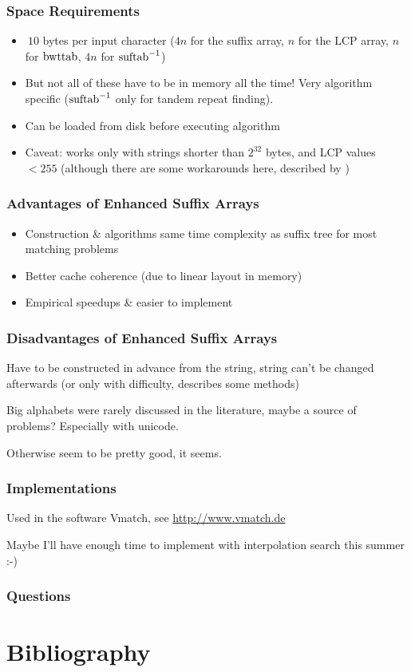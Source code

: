 \documentclass[compress,handout]{beamer} %
\begin{document}
\begin{frame}
	\frametitle{Space Requirements}
	\begin{itemize}
		\item $~10$ bytes per input character ($4n$ for the suffix array, $n$ for the LCP array, $n$ for $\hbox{bwttab}$, $4n$ for $\hbox{suftab}^{-1}$)
		\item But not all of these have to be in memory all the time! Very algorithm specific ($\hbox{suftab}^{-1}$ only for tandem repeat finding).
		\item Can be loaded from disk before executing algorithm
		\item Caveat: works only with strings shorter than $2^{32}$ bytes, and LCP values $<255$ (although there are some workarounds here, described by \cite{abouelhoda2004replacing})
	\end{itemize}
\end{frame}

\begin{frame}
	\frametitle{Advantages of Enhanced Suffix Arrays}
	\begin{itemize}
		\item Construction \& algorithms same time complexity as suffix tree for most matching problems
		\item Better cache coherence (due to linear layout in memory)
		\item Empirical speedups \& easier to implement
	\end{itemize}
\end{frame}

\begin{frame}
	\frametitle{Disadvantages of Enhanced Suffix Arrays}
	Have to be constructed in advance from the string, string
	can't be changed afterwards (or only with difficulty,
	\cite{salson2010dynamic} describes some methods)

	Big alphabets were rarely discussed in the literature, maybe a
	source of problems? Especially with unicode.

	Otherwise seem to be pretty good, it seems.
\end{frame}

\begin{frame}
	\frametitle{Implementations}
	Used in the software Vmatch, see \href{http://www.vmatch.de}{http://www.vmatch.de}

	\vspace{1cm}

	Maybe I'll have enough time to implement with interpolation
	search this summer :-)
\end{frame}


\begin{frame}
	\frametitle{Questions}
	\Huge{\textinterrobang}
\end{frame}

\section{Bibliography}



\end{document}
